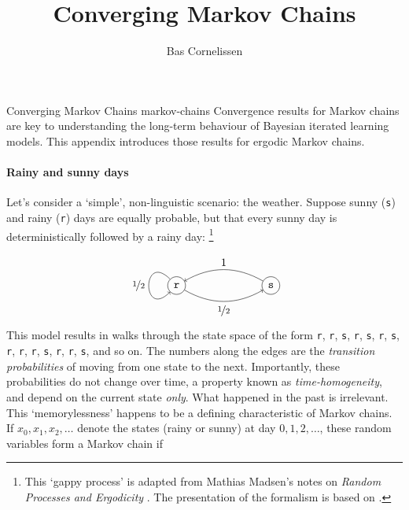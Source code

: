 \documentclass{../src/bcthesispart}
\title{Converging Markov Chains}
\author{Bas Cornelissen}
\begin{document}

%
	{Converging Markov Chains}%
	{markov-chains}{%
	Convergence results for Markov chains are key to understanding the long-term behaviour of Bayesian iterated learning models. 
	This appendix introduces those results for ergodic Markov chains.
	}




\paragraph{Rainy and sunny days}

Let's consider a ‘simple’, non-linguistic scenario: the weather.
Suppose sunny (\texttt{s}) and rainy (\texttt{r}) days are equally probable, but that every sunny day is deterministically followed by a rainy day:%
		\footnote{%
		This ‘gappy process’ is adapted from Mathias Madsen’s notes on \emph{Random Processes and Ergodicity} \parencite{Madsen2015a}.
		The presentation of the formalism is based on \textcite{Norris1997}.}
\begin{equation}
	\label{eq:markov-example}
	\begin{tikzpicture}
		\tikzstyle{line node} = [draw, fill=white, font=\footnotesize ]
	    \node[shape=circle,draw=black] (1) at (0,0) {\texttt{r}};
	    \node[shape=circle,draw=black] (2) at (3,0) {\texttt{s}};
	    \path [->](1) edge[bend right] node[midway,below] {$\nicefrac{1}{2}$} (2);
	    \path [->](2) edge[bend right] node[midway,above] {$1$} (1);
	    \path [->](1) edge[out=135,in=225,looseness=8] node[midway,left] {$\nicefrac{1}{2}$} (1);
	\end{tikzpicture}
\end{equation}
\def\ttr{\texttt{r}}%
\def\tts{\texttt{s}}%
This model results in walks through the state space of the form \ttr, \ttr, \tts, \ttr, \tts, \ttr, \tts, \ttr, \ttr, \ttr, \tts, \ttr, \ttr, \tts, and so on.
The numbers along the edges are the \emph{transition probabilities} of moving from one state to the next.
Importantly, these probabilities do not change over time, a property known as \emph{time-homogeneity}, and depend on the current state \emph{only}.
What happened in the past is irrelevant.
This ‘memorylessness’ happens to be a defining characteristic of Markov chains.
If $x_0, x_1, x_2, \dots$ denote the states (rainy or sunny) at day $0, 1, 2, \dots$, these random variables form a Markov chain if
\end{document}
